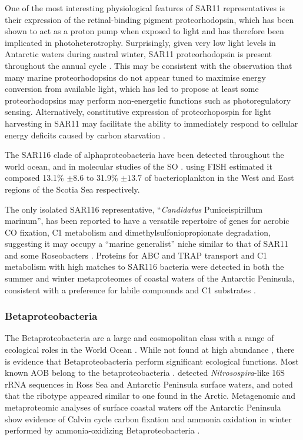 One of the most interesting physiological features of SAR11 representatives is their expression of the retinal-binding pigment proteorhodopsin, which has been shown to act as a proton pump when exposed to light \cite{Anonymous:2012ck} and has therefore been implicated in photoheterotrophy.
Surprisingly, given very low light levels in Antarctic waters during austral winter, SAR11 proteorhodopsin is present throughout the annual cycle \cite{Williams:2012bs}.
This may be consistent with the observation that many marine proteorhodopsins do not appear tuned to maximise energy conversion from available light, which has led \citet{Fuhrman:2008he} to propose at least some proteorhodopsins may perform non-energetic functions such as photoregulatory sensing.
Alternatively, constitutive expression of proteorhopospin for light harvesting in SAR11 may facilitate the ability to immediately respond to cellular energy deficits caused by carbon starvation \cite{Steindler:2011hk}.


The SAR116 clade of alphaproteobacteria have been detected throughout the world ocean, and in molecular studies of the \ac{SO} \cite{West:2008kc,Topping:2006ul}.
 \citet{Topping:2006ul} using \ac{FISH} estimated it composed 13.1\% $\pm 8.6$ to 31.9\% $\pm13.7$ of bacterioplankton in the West and East regions of the Scotia Sea respectively.

The only isolated SAR116 representative, ``\emph{Candidatus} Puniceispirillum marinum'', has been reported to have a versatile repertoire of genes for aerobic CO fixation, C1 metabolism and dimethylsulfoniopropionate degradation, suggesting it may occupy a ``marine generalist'' niche similar to that of SAR11 and some Roseobacters \cite{Oh:2010di}.
Proteins for ABC and TRAP transport and C1 metabolism with high matches to SAR116 bacteria were detected in both the summer and winter metaproteomes of coastal waters of the Antarctic Peninsula, consistent with a preference for labile compounds and C1 substrates \cite{Williams:2012bs}.

\subsubsection{Betaproteobacteria}

The Betaproteobacteria are a large and cosmopolitan class with a range of ecological roles in the World Ocean \citep[reviewed in][]{Kirchman:2008wz}.
While not found at high abundance \cite{Gentile:2006ef,Ghiglione:2011ee,Jamieson:2012up}, there is evidence that Betaproteobacteria perform significant ecological functions.
Most known \ac{AOB} belong to the betaproteobacteria \cite{Head:1993vt,Teske:1994wt}.
\citet{Hollibaugh:2002em} detected \emph{Nitrosospira}-like 16S rRNA sequences in Ross Sea and Antarctic Peninsula surface waters, and noted that the ribotype appeared similar to one found in the Arctic.
Metagenomic and metaproteomic analyses of surface coastal waters off the Antarctic Peninsula show evidence of Calvin cycle carbon fixation and ammonia oxidation in winter performed by ammonia-oxidizing Betaproteobacteria \cite{Grzymski:2012ej,Williams:2012bs}.

